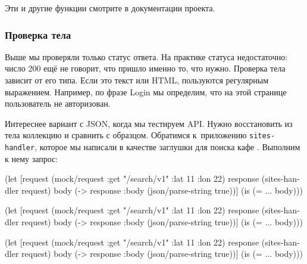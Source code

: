 \fi

\noindent
Эти и другие функции смотрите в документации проекта.

\subsubsection*{Проверка тела}

Выше мы проверяли только статус ответа. На практике статуса недостаточно: число
200 ещё не говорит, что пришло именно то, что нужно. Проверка тела зависит от
его типа. Если это текст или HTML, пользуются регулярным выражением. Например,
по фразе Login мы определим, что на этой странице пользователь не авторизован.


Интереснее вариант с JSON, когда мы тестируем API. Нужно восстановить из тела
коллекцию и сравнить с образцом. Обратимся к~приложению \verb|sites-handler|,
которое мы написали в качестве заглушки для поиска кафе .
Выполним к нему запрос:

\pagebreakafive

\ifnarrow

\begin{english}
  \begin{clojure}
(let [request (mock/request
                :get "/search/v1"
                {:lat 11 :lon 22})
      response (sites-handler request)
      body (-> response
               :body
               (json/parse-string
                 true))]
  (is (= {...} body)))
  \end{clojure}
\end{english}

\else

\ifafive

\begin{english}
  \begin{clojure}
(let [request (mock/request
                :get "/search/v1"
                {:lat 11 :lon 22})
      response (sites-handler request)
      body (-> response
               :body
               (json/parse-string true))]
  (is (= {...} body)))
  \end{clojure}
\end{english}

\else

\begin{english}
  \begin{clojure}
(let [request (mock/request :get "/search/v1"
                            {:lat 11 :lon 22})
      response (sites-handler request)
      body (-> response
               :body
               (json/parse-string true))]
  (is (= {...} body)))
  \end{clojure}
\end{english}

